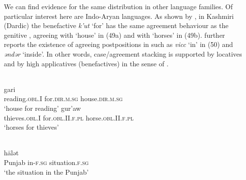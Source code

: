 \documentclass[output=paper]{langsci/langscibook}
\begin{document}
We can find evidence for the same distribution in other language families. Of particular interest here are Indo-Aryan languages. As shown by \citet{Payne1995}, in Kashmiri (Dardic) the benefactive  \textit{k’ut} ‘for’ has the same agreement behaviour as the genitive , agreeing with ‘house’ in (49a) and with ‘horses’ in (49b). \citet{Payne1995} further reports the existence of agreeing  postpositions in  such as \textit{vicc} ‘in’ in (50) and \textit{ənd}\textit{ər} ‘inside’. In other words, case\slash agreement stacking is supported by locatives and by high applicatives (benefactives) in the sense of \citet{Pylkkänen2008}.

\ea%
     \citep[293]{Payne1995}\label{ex:manzini:49}\\
    \ea
    \gll\relax [ paranas     k'ut]     gari \\
         {} reading.\textsc{obl}.I   for.\textsc{dir.m.sg}  house.\textsc{dir.m.sg}\\
    \glt ‘house for reading’  
    \ex  
    \gll\relax [ cur'an     k'it'aw]     gur'aw\\
         {} thieves.\textsc{obl}.I   for.\textsc{obl}.II.\textsc{f.pl}   horse.\textsc{obl.II.f.pl}\\
    \glt ‘horses for thieves’
    \z
\z

          

    

\ea%
          \citep[289]{Payne1995}\label{ex:manzini:50}\\
    \gll [ pənj\=ab  vicl-\=\i]    h\=alət        \\
         {} Punjab   in-\textsc{f.sg}  situation.\textsc{f.sg}\\
    \glt ‘the situation in the Punjab’ 
    \z
\end{document}
